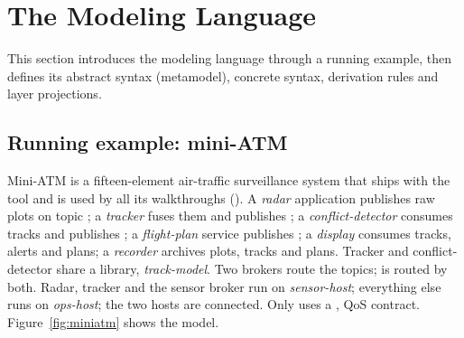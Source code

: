\section{The \sag{} Modeling Language}
\label{sec:modeling}

This section introduces the modeling language through a running example, then defines its abstract syntax (metamodel), concrete syntax, derivation rules and layer projections.

\subsection{Running example: mini-ATM}
\label{sec:modeling:example}

Mini-ATM is a fifteen-element air-traffic surveillance system that ships with the tool and is used by all its walkthroughs (). A \emph{radar} application publishes raw plots on topic ; a \emph{tracker} fuses them and publishes ; a \emph{conflict-detector} consumes tracks and publishes ; a \emph{flight-plan} service publishes ; a \emph{display} consumes tracks, alerts and plans; a \emph{recorder} archives plots, tracks and plans. Tracker and conflict-detector share a library, \emph{track-model}. Two brokers route the topics;  is routed by both. Radar, tracker and the sensor broker run on \emph{sensor-host}; everything else runs on \emph{ops-host}; the two hosts are connected. Only  uses a ,  QoS contract. Figure~\ref{fig:miniatm} shows the model.

